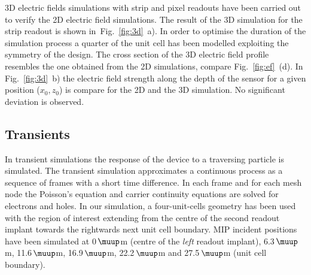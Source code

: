 \documentclass[a4paper,11pt]{article}
\begin{document}
3D electric fields simulations with strip and pixel readouts have been carried out to verify the 2D electric field simulations.
The result of the 3D simulation for the strip readout is shown in~Fig.~\ref{fig:3d}~a).
In order to optimise the duration of the simulation process a quarter of the unit cell has been modelled exploiting the symmetry of the design.
The cross section of the 3D electric field profile resembles the one obtained from the 2D simulations, compare Fig.~\ref{fig:ef}~(d). 
In Fig.~\ref{fig:3d}~b) the electric field strength along the depth of the sensor for a given position ($x_0,z_0$) is compare for the 2D and the 3D simulation. 
No significant deviation is observed.


\subsection{Transients}
\label{sec:tr}
In transient simulations the response of the device to a traversing particle is simulated. 
The transient simulation approximates a continuous process as a sequence of frames with a short time difference. 
In each frame and for each mesh node the Poisson's equation and carrier continuity equations are solved for electrons and holes.
In our simulation, a four-unit-cells geometry has been used with the region of interest extending from the centre of the second readout implant towards the rightwards next unit cell boundary.  
MIP incident positions have been simulated at 0\,$\muup$m (centre of the \textit{left} readout implant), 6.3\,$\muup$m, 11.6\,$\muup$m, 16.9\,$\muup$m, 22.2\,$\muup$m and 27.5\,$\muup$m (unit cell boundary).
\end{document}
